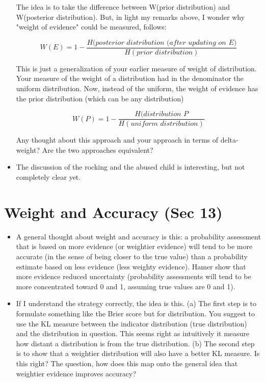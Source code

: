 \documentclass[
  10pt,
  dvipsnames,enabledeprecatedfontcommands]{scrartcl}
\begin{document}
\begin{itemize}
The idea is to take the difference between W(prior distribution) and W(posterior distribution). But, in light my remarks above, I wonder why "weight of evidence" could be measured, follows:

\[W(E) = 1 - \frac{H(\textit{posterior distribution (after updating on E)}}{H(\textit{prior distribution})}\]

This is just a generalization of your earlier measure of weight of distribution. Your measure of the weight of a distribution had in the denominator  the uniform distribution. Now, instead of the uniform, the weight of evidence has the prior distribution (which can be any distribution)

\[W(P) = 1 - \frac{H(\textit{distribution P}}{H(\textit{uniform distribution})}\]

Any thought about this approach and your approach in 
terms of delta-weight? Are the two approaches equivalent?

\item The discussion of the rocking and the abused child is interesting, but not completely clear yet.

\end{itemize}

\hypertarget{weight-and-accuracy-sec-13}{%
\section{Weight and Accuracy (Sec
13)}\label{weight-and-accuracy-sec-13}}

\begin{itemize}

\item A general thought about weight and accuracy is this: a probability assessment that is based on more evidence (or weightier evidence) will tend to be more accurate (in the sense of being closer to the true value) than a probability estimate based on less evidence (less weighty evidence). Hamer show that more evidence reduced uncertainty (probability assessments will tend to be more concentrated toward 0 and 1, assuming true values are 0 and 1). 

\item If I understand the strategy correctly, the idea is this. (a) The first step is to formulate something 
like the Brier score but for distribution. You suggest to use the KL measure between the indicator distribution (true distribution) and the distribution in question. This seems right as intuitively it measure how distant a distribution is from the true distribution. (b) The second step is to show that a weightier distribution will also have a better KL measure. Is this right? The question, how does this map onto the general idea that weightier evidence improves accuracy?









\end{itemize}
\end{document}
